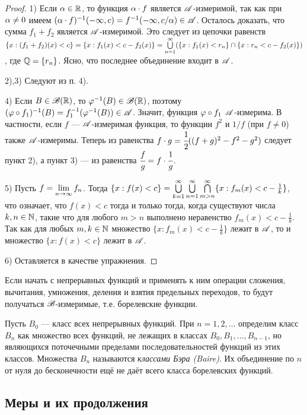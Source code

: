 \documentclass[10pt]{article}
\begin{document}
\begin{proof}
1) Если $\alpha\in\mathbb{R}$, то функция $\alpha\cdot f$ является
$\mathscr{A}$-измеримой, так как при $\alpha\ne 0$ имеем $(\al\cdot
f)^{-1}(-\infty,c)\bw=f^{-1}(-\infty,c/\al)\in\As$. Осталось
доказать, что сумма $f_1+f_2$ является $\mathscr{A}$-измеримой. Это следует
из цепочки равенств $\{x:(f_1+f_2)(x)<c\}\bw
=\{x:f_1(x)<c-f_2(x)\}\bw
=\cupnui(\{x:f_1(x)<r_n\}\cap\{x:r_n<c-f_2(x)\})$, где $\mathbb{Q}=\{r_n\}$.
Ясно, что последнее объединение входит в $\mathscr{A}$.

2),3) Следуют из п. 4).

4) Если $B\in\mathscr{B}(\mathbb{R})$, то $\varphi^{-1}(B)\in\mathscr{B}(\mathbb{R})$, поэтому
$(\ph\circ f_1)^{-1}(B)\bw=f^{-1}_1(\ph^{-1}(B))\bw\in\As$. Значит,
функция $\varphi\circ f_1$ $\mathscr{A}$-измерима. В частности, если $f$ ---
$\mathscr{A}$-измеримая функция, то функции $f^2$ и $1/f$ (при $f\ne0$)
также $\mathscr{A}$-измеримы. Теперь из равенства $f\cdot
g=\cfrac12((f+g)^2-f^2-g^2)$ следует пункт 2), а пункт 3) --- из
равенства $\cfrac{f}{g}=f\cdot\cfrac1g$.

5) Пусть $f=\lim\limits_{n\rightarrow\infty}f_n$. Тогда $\{x:f(x)<c\}
=\bigcup\limits_{k=1}^{\infty}\bigcup\limits_{n=1}^{\infty} \bigcap\limits_{m>n}^\infty \{x:f_m(x)<c-\frac1k\}$,
что означает, что $f(x)<c$ тогда и только тогда, когда существуют
числа $k,n\in\mathbb{N}$, такие что для любого $m>n$ выполнено неравенство
$f_m(x)<c-\frac1k$. Так как для любых $m,k\in\mathbb{N}$ множество
$\{x:f_m(x)<c-\frac1k\}$ лежит в $\mathscr{A}$, то и множество
$\{x:f(x)<c\}$ лежит в $\mathscr{A}$.

6) Оставляется в качестве упражнения.
\end{proof}

\begin{imp}
Если начать с непрерывных функций и применять к ним операции
сложения, вычитания, умножения, деления и взятия предельных
переходов, то будут получаться $\mathscr{B}$-измеримые, т.е. борелевские
функции.
\end{imp}

\begin{note}
Пусть $B_0$ --- класс всех непрерывных функций. При $n=1,2,\ldots$
определим класс $B_n$ как множество всех функций, не лежащих в
классах $B_0,B_1,\ldots,B_{n-1}$, но являющихся поточечными
пределами последовательностей функций из этих классов. Множества
$B_n$ называются \emph{классами Бэра (Baire)}. Их объединение по $n$
от нуля до бесконечности ещё не даёт всего класса борелевских
функций.
\end{note}

\subsection{Меры и их продолжения}
\end{document}
